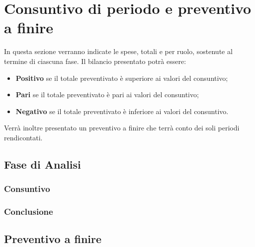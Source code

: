 \section{Consuntivo di periodo e preventivo a finire}
In questa sezione verranno indicate le spese, totali e per ruolo, sostenute al termine di ciascuna fase.
Il bilancio presentato potrà essere:
\begin{itemize}
	\item \textbf{Positivo} se il totale preventivato è superiore ai valori del consuntivo;
	\item \textbf{Pari} se il totale preventivato è pari ai valori del consuntivo;
	\item \textbf{Negativo} se il totale preventivato è inferiore ai valori del consuntivo.
\end{itemize}
Verrà inoltre presentato un preventivo a finire che terrà conto dei soli periodi rendicontati.
\subsection{Fase di Analisi}
	\subsubsection{Consuntivo}
	\subsubsection{Conclusione}

\subsection{Preventivo a finire}